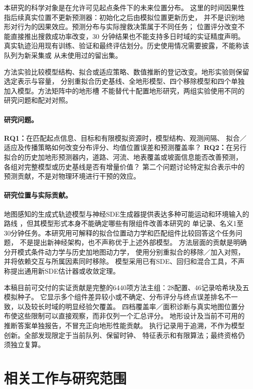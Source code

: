 \documentclass[UTF8,11pt]{ctexart}
\begin{document}
本研究的科学对象是在允许可见起点条件下的未来位置分布。
这里的时间因果性指后续真实位置不更新预测器：初始化之后由模拟位置更新历史，
并不是识别地形对行为的因果效应。预测分布与实际搜救决策属于不同任务；
位置评分改变不能直接推出搜救成功率改变，30 分钟结果也不能支持多日时域的实证精度声明。
真实轨迹沿用现有训练、验证和最终评估划分。历史使用情况需要披露，不能称该队列为新采集或
从未使用过的留出集。

方法实验比较模型结构、拟合或适应策略、数值推断的登记改变。地形实验则保留选定表示与容量，
分别重拟合历史基线、全地形模型、四个移除模型和四个单独加入模型。方法矩阵中的地形槽
不能替代十配置地形研究，两组实验使用不同的研究问题和配对对照。

\paragraph{研究问题。}
\label{sec:research-questions}
\textbf{RQ1：}在匹配起点信息、目标和有限模拟资源时，模型结构、观测间隔、
拟合／适应及传播策略如何改变分布评分、均值位置误差和预测覆盖率？
\textbf{RQ2：}在另行拟合的历史加地形预测器内，道路、河流、地表覆盖或坡面信息能否改善预测，
各组对完整模型或历史基线是否有增量价值？
第二个问题讨论特定拟合表示中的预测贡献，不是对物理环境进行干预的效应。

\paragraph{研究位置与实际贡献。}
地图感知的生成式轨迹模型与神经SDE生成器提供表达多种可能运动和环境输入的路线
\cite{salzmann2020,kidger2021}，但其模型形式本身不能确定哪些有限组件改善本研究的
单记录、名义1至30分钟任务。本研究用可解释的拟合位置动力学和匹配组件比较回答这个任务问题，
不是提出新神经架构，也不声称优于上述外部模型。
方法层面的贡献是明确分开模式条件动力学与历史加地图动力学，
使用分别重拟合的移除／加入对照，并将依赖交互与所属因素同时移除。
模型采用已有SDE、回归和混合工具，不声称提出通用新SDE估计器或收敛定理。

本稿目前可交付的实证贡献是完整的6440项方法主组：28配置、46记录哈希块及五模拟种子。
它显示多个组件差异较小或不确定、分布评分与终点误差排名不一致，以及较长时域的明显经验欠覆盖。
四档覆盖率／面积诊断与真实地图位置分布使这些限制可以直接观察，而非仅列一个汇总评分。
地形设计及当前不可用的推断答案单独报告，不冒充正向地形性能贡献。
执行记录用于追溯，不作为模型创新。全部发现限定于当前队列、保留时钟、
特征表示和有限算法；最终资格仍须独立复算。

\section{相关工作与研究范围}\label{sec:related-work}
\end{document}
